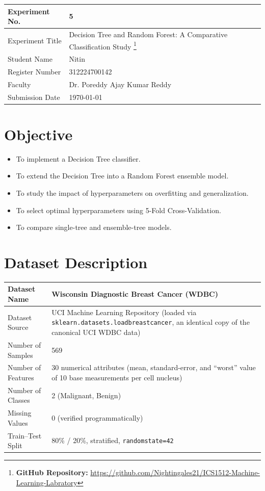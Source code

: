 \documentclass[12pt,a4paper]{article}
\DeclareRobustCommand{\_}{\textunderscore\allowbreak}
\begin{document}
\noindent\begin{tabular}{|p{4cm}|p{\dimexpr\linewidth-4cm-4\tabcolsep-3\arrayrulewidth\relax}|}
\hline
Experiment No. & 5 \\ \hline
Experiment Title & Decision Tree and Random Forest: A Comparative Classification Study
\footnote{\textbf{GitHub Repository: }\url{https://github.com/Nightingales21/ICS1512-Machine-Learning-Labratory}}\\ \hline
Student Name & Nitin \\ \hline
Register Number & 312224700142 \\ \hline
Faculty & Dr. Poreddy Ajay Kumar Reddy \\ \hline
Submission Date & \today \\ \hline
\end{tabular}

\section{Objective}
\begin{itemize}
\item To implement a Decision Tree classifier.
\item To extend the Decision Tree into a Random Forest ensemble model.
\item To study the impact of hyperparameters on overfitting and generalization.
\item To select optimal hyperparameters using 5-Fold Cross-Validation.
\item To compare single-tree and ensemble-tree models.
\end{itemize}

\section{Dataset Description}
\begin{longtable}{|p{6cm}|p{8cm}|}
\hline
Dataset Name & Wisconsin Diagnostic Breast Cancer (WDBC) \\ \hline
Dataset Source & UCI Machine Learning Repository (loaded via
\texttt{sklearn.datasets.load\_breast\_cancer}, an identical copy of the
canonical UCI WDBC data) \\ \hline
Number of Samples & 569 \\ \hline
Number of Features & 30 numerical attributes (mean, standard-error, and
``worst'' value of 10 base measurements per cell nucleus) \\ \hline
Number of Classes & 2 (Malignant, Benign) \\ \hline
Missing Values & 0 (verified programmatically) \\ \hline
Train--Test Split & 80\% / 20\%, stratified, \texttt{random\_state=42} \\ \hline
\end{longtable}
\end{document}
